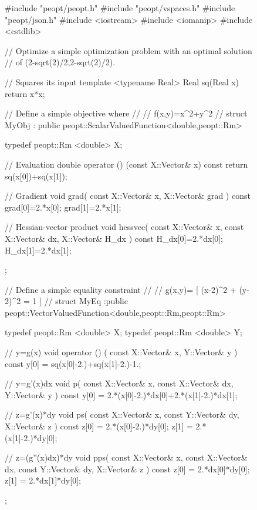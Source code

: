 \begin{figure}
    \begin{lstCpp}
#include "peopt/peopt.h"
#include "peopt/vspaces.h"
#include "peopt/json.h"
#include <iostream>
#include <iomanip>
#include <cstdlib>

// Optimize a simple optimization problem with an optimal solution
// of (2-sqrt(2)/2,2-sqrt(2)/2).

// Squares its input
template <typename Real>
Real sq(Real x){
    return x*x;
}

// Define a simple objective where 
// 
// f(x,y)=x^2+y^2
//
struct MyObj
    : public peopt::ScalarValuedFunction<double,peopt::Rm>
{
    typedef peopt::Rm <double> X;

    // Evaluation 
    double operator () (const X::Vector& x) const {
        return sq(x[0])+sq(x[1]);
    }

    // Gradient
    void grad(
        const X::Vector& x,
        X::Vector& grad
    ) const {
        grad[0]=2.*x[0];
        grad[1]=2.*x[1];
    }

    // Hessian-vector product
    void hessvec(
        const X::Vector& x,
        const X::Vector& dx,
        X::Vector& H_dx
    ) const {
        H_dx[0]=2.*dx[0];
        H_dx[1]=2.*dx[1];
    }
};
\end{lstCpp}
\end{figure}
\begin{figure}
    \ContinuedFloat
    \begin{lstCpp}
// Define a simple equality constraint
//
// g(x,y)= [ (x-2)^2 + (y-2)^2 = 1 ] 
//
struct MyEq
    :public peopt::VectorValuedFunction<double,peopt::Rm,peopt::Rm>
{
    typedef peopt::Rm <double> X;
    typedef peopt::Rm <double> Y;

    // y=g(x) 
    void operator () (
        const X::Vector& x,
        Y::Vector& y
    ) const {
        y[0] = sq(x[0]-2.)+sq(x[1]-2.)-1.;
    }

    // y=g'(x)dx
    void p(
        const X::Vector& x,
        const X::Vector& dx,
        Y::Vector& y
    ) const {
        y[0] = 2.*(x[0]-2.)*dx[0]+2.*(x[1]-2.)*dx[1];
    }

    // z=g'(x)*dy
    void ps(
        const X::Vector& x,
        const Y::Vector& dy,
        X::Vector& z
    ) const {
        z[0] = 2.*(x[0]-2.)*dy[0];
        z[1] = 2.*(x[1]-2.)*dy[0];
    }

    // z=(g''(x)dx)*dy
    void pps(
        const X::Vector& x,
        const X::Vector& dx,
        const Y::Vector& dy,
        X::Vector& z
    ) const {
        z[0] = 2.*dx[0]*dy[0];
        z[1] = 2.*dx[1]*dy[0];
    }
};
\end{lstCpp}
\end{figure}
